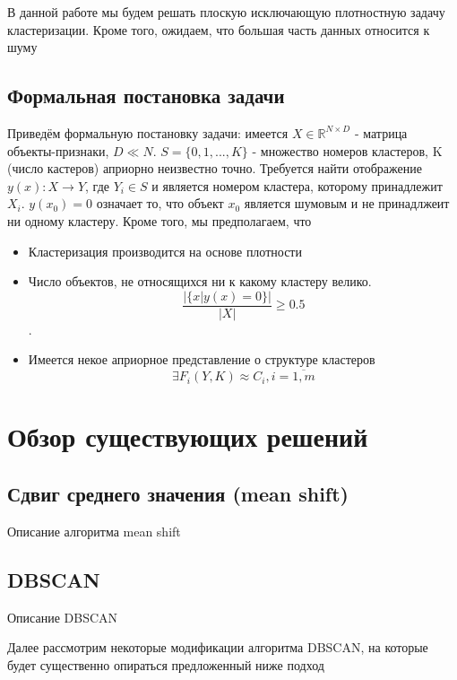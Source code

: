 \documentclass[12pt,fleqn]{article}
\begin{document}
В данной работе мы будем решать плоскую исключающую плотностную задачу кластеризации. Кроме того, ожидаем, что большая часть данных относится к шуму

\subsection{Формальная постановка задачи}
Приведём формальную постановку задачи: имеется $X \in \mathbb {R}^{N \times D}$ -  матрица объекты-признаки, $D \ll N$. $S = \{0, 1, ..., K \}$ - множество номеров кластеров, K (число кастеров) априорно неизвестно точно. Требуется найти отображение $y(x): X \rightarrow Y$, где $Y_i \in S$ и является номером кластера, которому принадлежит $X_i$.
 $y(x_0) = 0$ означает то, что объект $x_0$ является шумовым и не принадлжеит ни одному кластеру. Кроме того, мы предполагаем, что
\begin{itemize}
\item Кластеризация производится на основе плотности 

\item Число объектов, не относящихся ни к какому кластеру велико. 
\begin{equation}\label{more_noize}
         \frac{|\{x|y(x)=0\}|}{|X|} \geqslant 0.5
      \end{equation}. 
\item Имеется некое априорное представление о структуре кластеров
\begin{equation}\label{features}
         \exists  F_i(Y, K) \approx C_i, i = \overline{1, m}
      \end{equation}
\end{itemize}

\section{Обзор существующих решений}

\subsection{Сдвиг среднего значения (mean shift)}
Описание алгоритма mean shift

\subsection {DBSCAN}
Описание DBSCAN

Далее рассмотрим некоторые модификации алгоритма DBSCAN, на которые будет существенно опираться предложенный ниже подход
\end{document}
